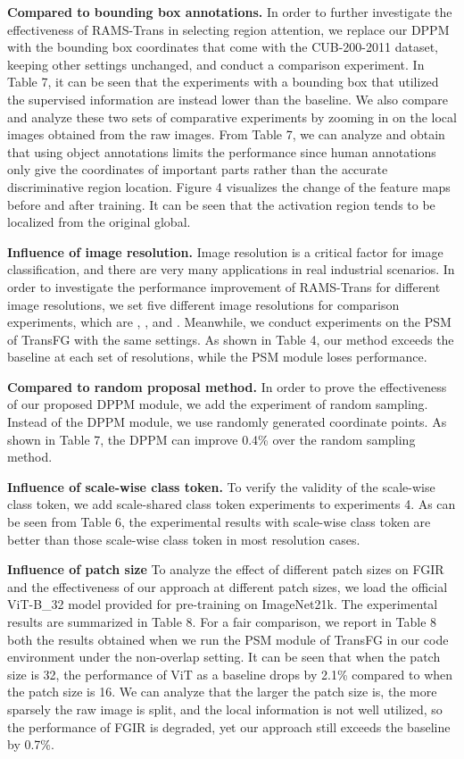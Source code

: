 \documentclass[sigconf]{acmart}
\begin{document}
\textbf{Compared to bounding box annotations.} In order to further investigate the effectiveness of RAMS-Trans in selecting region attention, we replace our DPPM with the bounding box coordinates that come with the CUB-200-2011 dataset, keeping other settings unchanged, and conduct a comparison experiment. In Table 7, it can be seen that the experiments with a bounding box that utilized the supervised information are instead lower than the baseline. We also compare and analyze these two sets of comparative experiments by zooming in on the local images obtained from the raw images. From Table 7, we can analyze and obtain that using object annotations limits the performance since human annotations only give the coordinates of important parts rather than the accurate discriminative region location. Figure 4 visualizes the change of the feature maps before and after training. It can be seen that the activation region tends to be localized from the original global.

\textbf{Influence of image resolution.} Image resolution is a critical factor for image classification, and there are very many applications in real industrial scenarios. In order to investigate the performance improvement of RAMS-Trans for different image resolutions, we set five different image resolutions for comparison experiments, which are , ,  and . Meanwhile, we conduct experiments on the PSM of TransFG with the same settings. As shown in Table 4, our method exceeds the baseline at each set of resolutions, while the PSM module loses performance.

\textbf{Compared to random proposal method.} In order to prove the effectiveness of our proposed DPPM module, we add the experiment of random sampling. Instead of the DPPM module, we use randomly generated coordinate points. As shown in Table 7, the DPPM can improve 0.4\% over the random sampling method.

\textbf{Influence of scale-wise class token.} To verify the validity of the scale-wise class token, we add scale-shared class token experiments to experiments 4. As can be seen from Table 6, the experimental results with scale-wise class token are better than those scale-wise class token in most resolution cases.

\textbf{Influence of patch size} To analyze the effect of different patch sizes on FGIR and the effectiveness of our approach at different patch sizes, we load the official ViT-B\_32 model provided for pre-training on ImageNet21k. The experimental results are summarized in Table 8. For a fair comparison, we report in Table 8 both the results obtained when we run the PSM module of TransFG in our code environment under the non-overlap setting. It can be seen that when the patch size is 32, the performance of ViT as a baseline drops by 2.1\% compared to when the patch size is 16. We can analyze that the larger the patch size is, the more sparsely the raw image is split, and the local information is not well utilized, so the performance of FGIR is degraded, yet our approach still exceeds the baseline by 0.7\%. 
\end{document}
